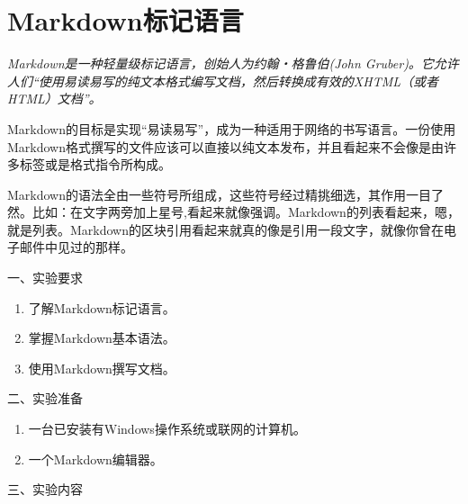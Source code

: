 \setcounter{chapter}{-1}
\chapter{Markdown标记语言}

{\itshape
Markdown是一种轻量级标记语言，创始人为约翰・格鲁伯(John Gruber)。它允许人们“使用易读易写的纯文本格式编写文档，然后转换成有效的XHTML（或者HTML）文档”。

Markdown的目标是实现“易读易写”，成为一种适用于网络的书写语言。一份使用Markdown格式撰写的文件应该可以直接以纯文本发布，并且看起来不会像是由许多标签或是格式指令所构成。

Markdown的语法全由一些符号所组成，这些符号经过精挑细选，其作用一目了然。比如：在文字两旁加上星号,看起来就像强调。Markdown的列表看起来，嗯，就是列表。Markdown的区块引用看起来就真的像是引用一段文字，就像你曾在电子邮件中见过的那样。
}

\vspace{0.2in}
\noindent
一、实验要求
\begin{enumerate}
  \item 了解Markdown标记语言。
  \item 掌握Markdown基本语法。
  \item 使用Markdown撰写文档。
\end{enumerate}

\vspace{0.2in}
\noindent
二、实验准备
\begin{enumerate}
  \item 一台已安装有Windows操作系统或联网的计算机。
  \item 一个Markdown编辑器。
\end{enumerate}

\vspace{0.2in}
\noindent
三、实验内容

